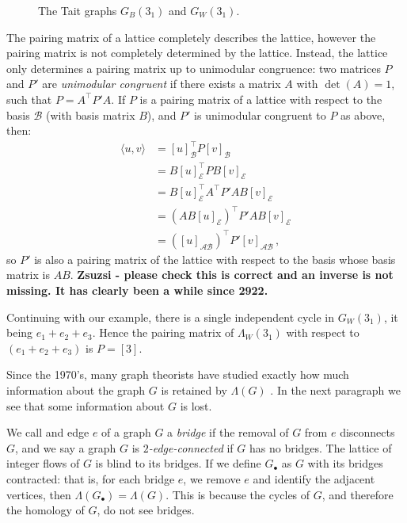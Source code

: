 \documentclass[12pt]{report}
\newcommand{\notered}[1]{{\color{Red} \textbf{#1}}}
\begin{document}
\begin{figure}[hbt]
	\centering
	\def\svgscale{0.4}
	
	\caption{The Tait graphs $G_{B}(3_{1})$ and $G_{W}(3_{1})$.}
	\label{fig:trefoil-abstract-tait}
\end{figure}

The pairing matrix of a lattice completely describes the lattice, however the pairing matrix is not completely determined by the lattice. Instead, the lattice only determines a pairing matrix up to unimodular congruence: two matrices $P$ and $P'$ are \textit{unimodular congruent} if there exists a matrix $A$ with $\det(A) = 1$, such that $P = A^{\top}P'A$. If $P$ is a pairing matrix of a lattice with respect to the basis $\mathcal{B}$ (with basis matrix $B$), and $P'$ is unimodular congruent to $P$ as above, then:
\begin{align*}
	\langle u, v \rangle & = [u]_{\mathcal{B}}^{\top} P [v]_{\mathcal{B}}                    \\
	                     & = B[u]_{\mathcal{E}}^{\top} P B[v]_{\mathcal{E}}                  \\
	                     & = B[u]_{\mathcal{E}}^{\top} A^{\top} P' A B[v]_{\mathcal{E}}      \\
	                     & = \left( AB[u]_{\mathcal{E}} \right)^{\top} P' AB[v]_{\mathcal{E}} \\
	                     & = \left( [u]_{\mathcal{AB}} \right)^{\top} P' [v]_{\mathcal{AB}}\,,
\end{align*}
so $P'$ is also a pairing matrix of the lattice with respect to the basis whose basis matrix is $AB$. \notered{Zsuzsi - please check this is correct and an inverse is not missing. It has clearly been a while since 2922.}


Continuing with our example, there is a single independent cycle in $G_{W}(3_{1})$, it being $e_{1} + e_{2} + e_{3}$. Hence the pairing matrix of $\Lambda_{W}(3_{1})$ with respect to $( e_{1} + e_{2} + e_{3})$ is $P = [3]$.

Since the 1970's, many graph theorists have studied exactly how much information about the graph $G$ is retained by $\Lambda(G)$ \parencite{lattice-of-flows-cuts, torelli-for-graphs-tropical-curves, lattice-of-flows-regular-matroid}. In the next paragraph we see that some information about $G$ is lost.

We call and edge $e$ of a graph $G$ a \textit{bridge} if the removal of $G$ from $e$ disconnects $G$, and we say a graph $G$ is \textit{$2$-edge-connected} if $G$ has no bridges. The lattice of integer flows of $G$ is blind to its bridges. If we define $G_{\bullet}$ as $G$ with its bridges contracted: that is, for each bridge $e$, we remove $e$ and identify the adjacent vertices, then $\Lambda(G_{\bullet}) = \Lambda(G)$. This is because the cycles of $G$, and therefore the homology of $G$, do not see bridges.
\end{document}
